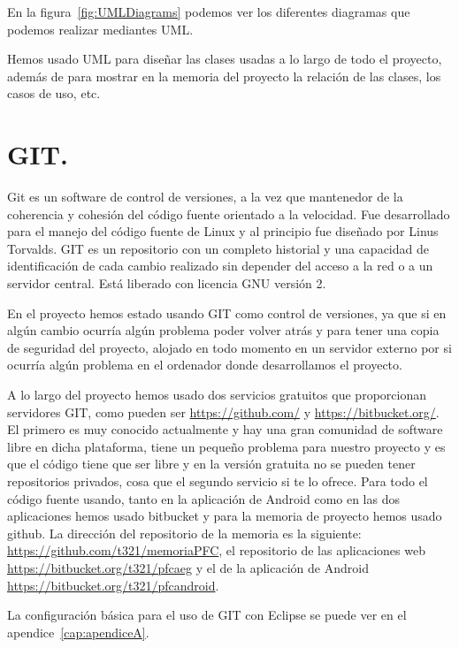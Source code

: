 En la figura~\ref{fig:UMLDiagrams} podemos ver los diferentes diagramas que podemos realizar mediantes UML.

Hemos usado UML para diseñar las clases usadas a lo largo de todo el proyecto, además de para mostrar en la memoria del proyecto la relación de las clases, los casos de uso, etc.

\section{GIT.}

Git es un software de control de versiones, a la vez que mantenedor de la coherencia y cohesión del código fuente orientado a la velocidad. Fue desarrollado para el manejo del código fuente de Linux y al principio fue diseñado por Linus Torvalds. GIT es un repositorio con un completo historial y una capacidad de identificación de cada cambio realizado sin depender del acceso a la red o a un servidor central. Está liberado con licencia GNU versión 2.

En el proyecto hemos estado usando GIT como control de versiones, ya que si en algún cambio ocurría algún problema poder volver atrás y para tener una copia de seguridad del proyecto, alojado en todo momento en un servidor externo por si ocurría algún problema en el ordenador donde desarrollamos el proyecto.

A lo largo del proyecto hemos usado dos servicios gratuitos  que proporcionan servidores GIT, como pueden ser \url{https://github.com/} y \url{https://bitbucket.org/}. El primero es muy conocido actualmente y hay una gran comunidad de software libre en dicha plataforma, tiene un pequeño problema para nuestro proyecto y es que el código tiene que ser libre y en la versión gratuita no se pueden tener repositorios privados, cosa que el segundo servicio si te lo ofrece. Para todo el código fuente usando, tanto en la aplicación de Android como en las dos aplicaciones hemos usado bitbucket y para la memoria de proyecto hemos usado github. La dirección del repositorio de la memoria es la siguiente: \url{https://github.com/t321/memoriaPFC}, el repositorio de las aplicaciones web \url{https://bitbucket.org/t321/pfcaeg} y el de la aplicación de Android \url{https://bitbucket.org/t321/pfcandroid}.

La configuración básica para el uso de GIT con Eclipse se puede ver en el apendice~\ref{cap:apendiceA}.  















